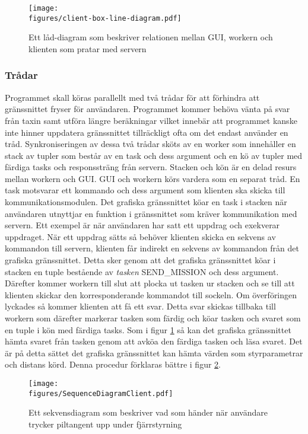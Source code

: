 \documentclass[tekniskrapport/tech.tex]{subfiles}
\begin{document}
\begin{figure}[h]
\centering
	\texttt{[image: \\figures/client-box-line-diagram.pdf]}
	\caption{Ett låd-diagram som beskriver relationen mellan GUI,
	workern och klienten som pratar med servern}
	\label{boxclient}
\end{figure} 

\subsubsection{Trådar}
Programmet skall köras parallellt med två trådar för att förhindra att
gränssnittet fryser för användaren. Programmet kommer behöva vänta på svar från
taxin samt utföra längre beräkningar vilket innebär att programmet kanske inte
hinner uppdatera gränssnittet tillräckligt ofta om det endast använder en tråd.
Synkroniseringen av dessa två trådar sköts av en worker som innehåller en stack
av tupler som består av en task och dess argument och en kö av tupler med
färdiga tasks och responssträng från servern. Stacken och kön är en delad resurs
mellan workern och GUI. GUI och workern körs vardera som en separat tråd. En
task motsvarar ett kommando och dess argument som klienten ska skicka till
kommunikationsmodulen. Det grafiska gränssnittet köar en task i stacken när
användaren utnyttjar en funktion i gränssnittet som kräver kommunikation med
servern. Ett exempel är när användaren har satt ett uppdrag och exekverar
uppdraget. När ett uppdrag sätts så behöver klienten skicka en sekvens av
kommandon till servern, klienten får indirekt en sekvens av kommandon från det
grafiska gränssnittet. Detta sker genom att det grafiska gränssnittet köar i
stacken en tuple bestående av \emph{tasken} SEND\_MISSION och dess argument.
Därefter kommer workern till slut att plocka ut tasken ur stacken och se till
att klienten skickar den korresponderande kommandot till sockeln. Om
överföringen lyckades så kommer klienten att få ett svar. Detta svar skickas
tillbaka till workern som därefter markerar tasken som färdig och köar tasken
och svaret som en tuple i kön med färdiga tasks. Som i figur \ref{boxclient} så
kan det grafiska gränssnittet hämta svaret från tasken genom att avköa den
färdiga tasken och läsa svaret. Det är på detta sättet det grafiska gränssnittet
kan hämta värden som styrparametrar och distans körd. Denna procedur förklaras
bättre i figur \ref{sequenceremote}.



\begin{figure}[h]
\centering
\texttt{[image: \\figures/SequenceDiagramClient.pdf]}
	\caption{Ett sekvensdiagram som beskriver vad som händer när användare trycker
    piltangent upp under fjärrstyrning}
	\label{sequenceremote}
\end{figure}
\end{document}
